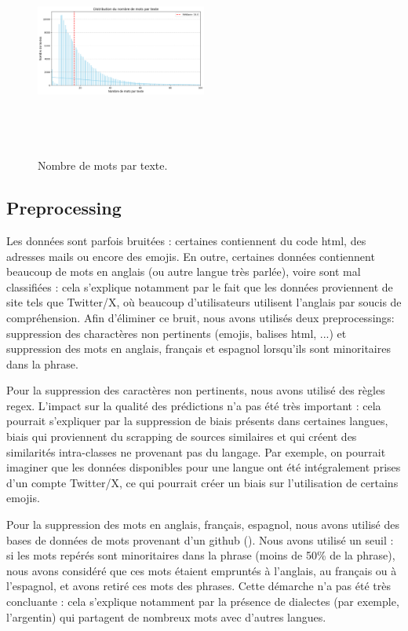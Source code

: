 \begin{figure}[h!]
    \centering
    \includegraphics[width=0.5\textwidth, height=7cm]{img/word_count.png}
    \caption{Nombre de mots par texte.}
    \label{fig:unbalance}
\end{figure}


\subsection{Preprocessing}
Les données sont parfois bruitées : certaines contiennent du code html, des adresses mails ou encore des emojis. En outre, certaines données contiennent beaucoup de mots en anglais (ou autre langue très parlée), voire sont mal classifiées : cela s'explique notamment par le fait que les données proviennent de site tels que Twitter/X, où beaucoup d'utilisateurs utilisent l'anglais par soucis de compréhension. Afin d'éliminer ce bruit, nous avons utilisés deux preprocessings: suppression des charactères non pertinents (emojis, balises html, ...) et suppression des mots en anglais, français et espagnol lorsqu'ils sont minoritaires dans la phrase.

Pour la suppression des caractères non pertinents, nous avons utilisé des règles regex. L'impact sur la qualité des prédictions n'a pas été très important : cela pourrait s'expliquer par la suppression de biais présents dans certaines langues, biais qui proviennent du scrapping de sources similaires et qui créent des similarités intra-classes ne provenant pas du langage. Par exemple, on pourrait imaginer que les données disponibles pour une langue ont été intégralement prises d'un compte Twitter/X, ce qui pourrait créer un biais sur l'utilisation de certains emojis.

Pour la suppression des mots en anglais, français, espagnol, nous avons utilisé des bases de données de mots provenant d'un github (\cite{hermitdave2018frequency}). Nous avons utilisé un seuil : si les mots repérés sont minoritaires dans la phrase (moins de 50\% de la phrase), nous avons considéré que ces mots étaient empruntés à l'anglais, au français ou à l'espagnol, et avons retiré ces mots des phrases. Cette démarche n'a pas été très concluante : cela s'explique notamment par la présence de dialectes (par exemple, l'argentin) qui partagent de nombreux mots avec d'autres langues.

